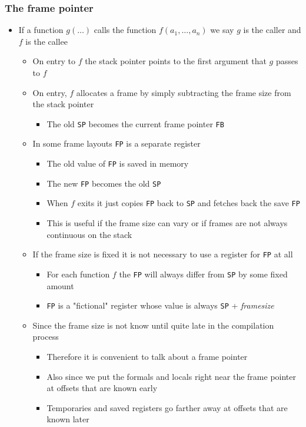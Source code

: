 \documentclass[11pt]{article}
\begin{document}
\subsubsection{The frame pointer}
\label{sec:org1051c5b}
\begin{itemize}
\item If a function \(g(\dots)\) calls the function \(f(a_1, \dots,a_n)\) we say \(g\) is the caller and \(f\) is the callee
\begin{itemize}
\item On entry to \(f\) the stack pointer points to the first argument that \(g\) passes to \(f\)
\item On entry, \(f\) allocates a frame by simply subtracting the frame size from the stack pointer
\begin{itemize}
\item The old \texttt{SP} becomes the current frame pointer \texttt{FB}
\end{itemize}
\item In some frame layouts \texttt{FP} is a separate register
\begin{itemize}
\item The old value of \texttt{FP} is saved in memory
\item The new \texttt{FP} becomes the old \texttt{SP}
\item When \(f\) exits it just copies \texttt{FP} back to \texttt{SP} and fetches back the save \texttt{FP}
\item This is useful if the frame size can vary or if frames are not always continuous on the stack
\end{itemize}
\item If the frame size is fixed it is not necessary to use a register for \texttt{FP} at all
\begin{itemize}
\item For each function \(f\) the \texttt{FP} will always differ from \texttt{SP} by some fixed amount
\item \texttt{FP} is a "fictional" register whose value is always \texttt{SP} + \emph{framesize}
\end{itemize}
\item Since the frame size is not know until quite late in the compilation process
\begin{itemize}
\item Therefore it is convenient to talk about a frame pointer
\item Also since we put the formals and locals right near the frame pointer at offsets that are known early
\item Temporaries and saved registers go farther away at offsets that are known later
\end{itemize}
\end{itemize}
\end{itemize}
\end{document}
